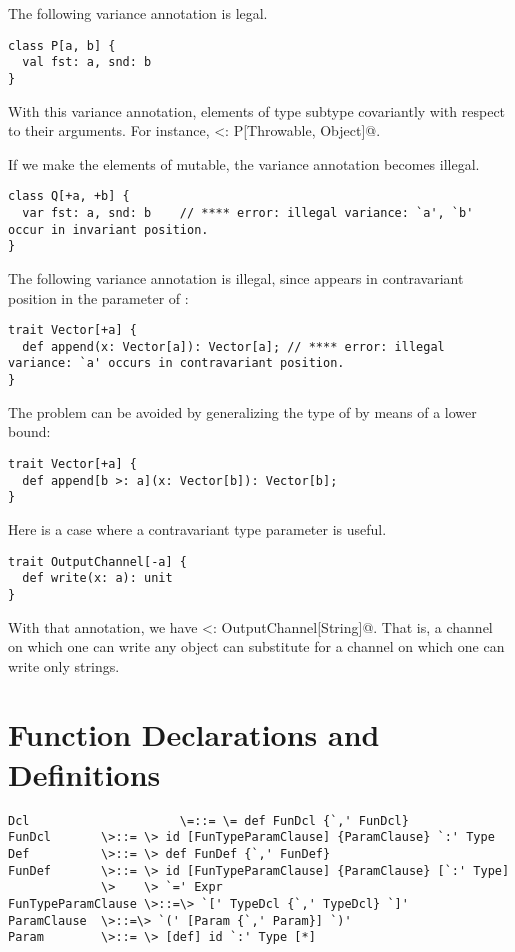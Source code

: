 \documentclass[11pt]{report}
\begin{document}
\example The following variance annotation is legal. 
\begin{verbatim}
class P[a, b] {
  val fst: a, snd: b
}\end{verbatim}
With this variance annotation, elements
of type \verb@P@ subtype covariantly with respect to their arguments. 
For instance,  <: P[Throwable, Object]@.

If we make the elements of \verb@P@ mutable, 
the variance annotation becomes illegal. 
\begin{verbatim}
class Q[+a, +b] { 
  var fst: a, snd: b    // **** error: illegal variance: `a', `b' occur in invariant position.
}
\end{verbatim}

\example The following variance annotation is illegal, since \verb@a@ appears
in contravariant position in the parameter of \verb@append@:

\begin{verbatim}
trait Vector[+a] {
  def append(x: Vector[a]): Vector[a]; // **** error: illegal variance: `a' occurs in contravariant position.
}
\end{verbatim} 
The problem can be avoided by generalizing the type of \verb@append@
by means of a lower bound:

\begin{verbatim}
trait Vector[+a] {
  def append[b >: a](x: Vector[b]): Vector[b];
}
\end{verbatim}

\example Here is a case where a contravariant type parameter is useful.

\begin{verbatim}
trait OutputChannel[-a] {
  def write(x: a): unit
}
\end{verbatim}
With that annotation, we have
\verb@OutputChannel[Object] <: OutputChannel[String]@.  That is, a
channel on which one can write any object can substitute for a channel
on which one can write only strings.

\section{Function Declarations and Definitions}
\label{sec:defdef}
\label{sec:funsigs}

\syntax\begin{verbatim} 
Dcl                     \=::= \= def FunDcl {`,' FunDcl} 
FunDcl       \>::= \> id [FunTypeParamClause] {ParamClause} `:' Type 
Def          \>::= \> def FunDef {`,' FunDef} 
FunDef       \>::= \> id [FunTypeParamClause] {ParamClause} [`:' Type] 
             \>    \> `=' Expr 
FunTypeParamClause \>::=\> `[' TypeDcl {`,' TypeDcl} `]' 
ParamClause  \>::=\> `(' [Param {`,' Param}] `)' 
Param        \>::= \> [def] id `:' Type [*]
\end{verbatim}
\end{document}
